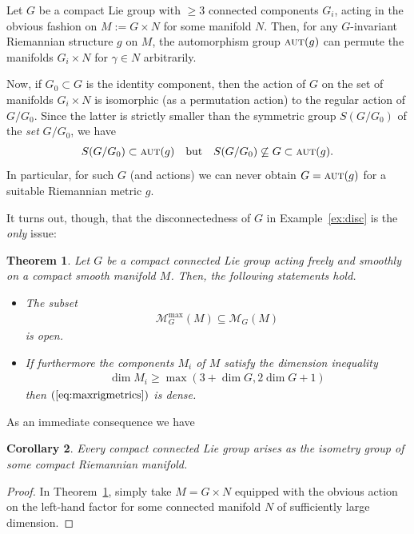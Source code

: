 \documentclass[10pt,a4paper]{amsart}
\numberwithin{equation}{section}
\newtheorem{Theorem}{Theorem}[section]
\newtheorem{Corollary}[Theorem]{Corollary}
\newcommand{\cat}[1]{\textsc{#1}}
\begin{document}
\begin{Example}\label{ex:disc}
 Let $G$ be a compact Lie group with $\ge 3$ connected components $G_i$, acting in the obvious fashion on $M:=G\times N$ for some manifold $N$. Then, for any $G$-invariant Riemannian structure $g$ on $M$, the automorphism group $\cat{aut}(g)$ can permute the manifolds $G_i\times N$ for $\gamma\in N$ arbitrarily.

Now, if $G_0\subset G$ is the identity component, then the action of $G$ on the set of manifolds $G_i\times N$ is isomorphic (as a permutation action) to the regular action of $G/G_0$. Since the latter is strictly smaller than the symmetric group $S(G/G_0)$ of the {\it set} $G/G_0$, we have
 \begin{gather*}
 S(G/G_0)\subset \cat{aut}(g)\quad \text{but}\quad S(G/G_0)\not\subseteq G\subset \cat{aut}(g).
 \end{gather*}
 In particular, for such $G$ (and actions) we can never obtain $G=\cat{aut}(g)$ for a suitable Riemannian metric $g$.
\end{Example}

It turns out, though, that the disconnectedness of $G$ in Example~\ref{ex:disc} is the {\it only} issue:


\begin{Theorem}\label{th:precaut}
 Let $G$ be a compact connected Lie group acting freely and smoothly on a compact smooth manifold $M$. Then, the following statements hold.
 \begin{itemize}\itemsep=0pt
 \item The subset
 \begin{gather}\label{eq:maxrigmetrics}
 \mathcal{M}^{\max}_G(M) \subseteq \mathcal{M}_G(M)
 \end{gather}
 is open.
 \item If furthermore the components $M_i$ of $M$ satisfy the dimension inequality
 \begin{gather}\label{eq:2g}
 \dim M_i\ge \max(3+\dim G,2\dim G+1)
 \end{gather}
 then $(\ref{eq:maxrigmetrics})$ is dense.
 \end{itemize}
\end{Theorem}


As an immediate consequence we have

\begin{Corollary}\label{cor:isiso}
 Every compact connected Lie group arises as the isometry group of some compact Riemannian manifold.
\end{Corollary}
\begin{proof}
 In Theorem~\ref{th:precaut}, simply take $M=G\times N$ equipped with the obvious action on the left-hand factor for some connected manifold $N$ of sufficiently large dimension.
\end{proof}
\end{document}
